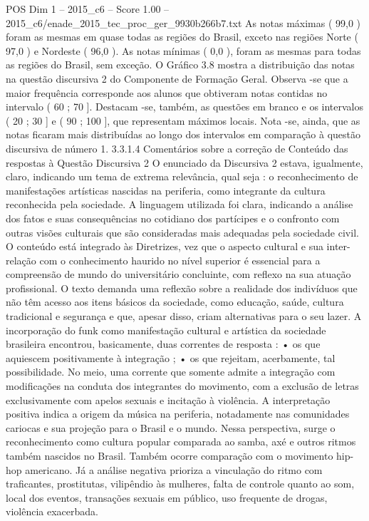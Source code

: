 \begin{textsample}{POS Dim 1 – 2015\_c6 – Score 1.00 – 2015\_c6/enade\_2015\_tec\_proc\_ger\_9930b266b7.txt}
As notas máximas ( 99,0 ) foram as mesmas em quase todas as regiões do Brasil, exceto nas regiões Norte ( 97,0 ) e Nordeste ( 96,0 ).
As notas mínimas ( 0,0 ), foram as mesmas para todas as regiões do Brasil, sem exceção.
O Gráfico 3.8 mostra a distribuição das notas na questão discursiva 2 do Componente de Formação Geral.
Observa -se que a maior frequência corresponde aos alunos que obtiveram notas contidas no intervalo ( 60 ; 70 ].
Destacam -se, também, as questões em branco e os intervalos ( 20 ; 30 ] e ( 90 ; 100 ], que representam máximos locais.
Nota -se, ainda, que as notas ficaram mais distribuídas ao longo dos intervalos em comparação à questão discursiva de número 1. 3.3.1.4 Comentários sobre a correção de Conteúdo das respostas à Questão Discursiva 2 O enunciado da Discursiva 2 estava, igualmente, claro, indicando um tema de extrema relevância, qual seja : o reconhecimento de manifestações artísticas nascidas na periferia, como integrante da cultura reconhecida pela sociedade.
A linguagem utilizada foi clara, indicando a análise dos fatos e suas consequências no cotidiano dos partícipes e o confronto com outras visões culturais que são consideradas mais adequadas pela sociedade civil.
O conteúdo está integrado às Diretrizes, vez que o aspecto cultural e sua inter-relação com o conhecimento haurido no nível superior é essencial para a compreensão de mundo do universitário concluinte, com reflexo na sua atuação profissional.
O texto demanda uma reflexão sobre a realidade dos indivíduos que não têm acesso aos itens básicos da sociedade, como educação, saúde, cultura tradicional e segurança e que, apesar disso, criam alternativas para o seu lazer.
A incorporação do funk como manifestação cultural e artística da sociedade brasileira encontrou, basicamente, duas correntes de resposta : • os que aquiescem positivamente à integração ; • os que rejeitam, acerbamente, tal possibilidade.
No meio, uma corrente que somente admite a integração com modificações na conduta dos integrantes do movimento, com a exclusão de letras exclusivamente com apelos sexuais e incitação à violência.
A interpretação positiva indica a origem da música na periferia, notadamente nas comunidades cariocas e sua projeção para o Brasil e o mundo.
Nessa perspectiva, surge o reconhecimento como cultura popular comparada ao samba, axé e outros ritmos também nascidos no Brasil.
Também ocorre comparação com o movimento hip-hop americano.
Já a análise negativa prioriza a vinculação do ritmo com traficantes, prostitutas, vilipêndio às mulheres, falta de controle quanto ao som, local dos eventos, transações sexuais em público, uso frequente de drogas, violência exacerbada.

\end{textsample}
